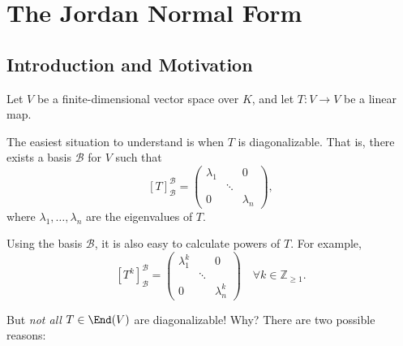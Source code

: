 \renewcommand{\thetheorem}{28.a.\arabic{theorem}}
\setcounter{theorem}{0}
\setcounter{chapter}{27}

\chapter{The Jordan Normal Form}

\section{Introduction and Motivation}

Let $V$ be a finite-di\-men\-sional vector space over $K$, and let $T \colon V \to V$ be a linear map.

The easiest situation to understand is when $T$ is diagonalizable. That is, there exists a basis $\mathcal{B}$ for $V$ such that 
\[
[T]_{\mathcal{B}}^{\mathcal{B}} = \begin{pmatrix} \lambda_1 & & 0 \\ & \ddots & \\ 0 & & \lambda_n \end{pmatrix},
\]
where $\lambda_1, \dots, \lambda_n$ are the eigenvalues of $T$.

Using the basis $\mathcal{B}$, it is also easy to calculate powers of $T$. For example, 
\[
[T^k]_{\mathcal{B}}^{\mathcal{B}} = \begin{pmatrix} \lambda_1^k & & 0 \\ & \ddots & \\ 0 & & \lambda_n^k \end{pmatrix} \quad \forall k \in \mathbb{Z}_{\ge 1}.
\]

But \emph{not all} $T \in \End(V)$ are diagonalizable! Why? There are two possible reasons:


